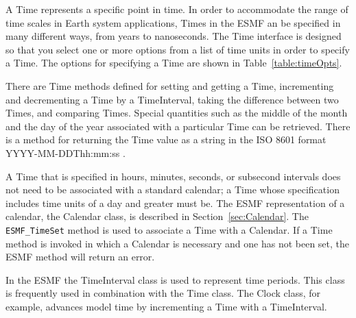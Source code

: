 \label{sec:Time}

A Time represents a specific point in time.  In order to accommodate
the range of time scales in Earth system applications, Times in
the ESMF an be specified in many different ways, from years to 
nanoseconds.  The Time interface is designed so that you select one or 
more options from a list of time units in order to specify a 
Time. The options for specifying a Time are shown in 
Table~\ref{table:timeOpts}.  

There are Time methods defined for setting and getting a
Time, incrementing and decrementing a Time by a TimeInterval,
taking the difference between two Times, and comparing Times.
Special quantities such as the middle of the month and the 
day of the year associated with a particular Time can be retrieved. 
There is a method for returning the Time value as a string in 
the ISO 8601 format YYYY-MM-DDThh:mm:ss \cite{ISO}.

A Time that is specified in hours, minutes, seconds, or subsecond intervals 
does not need to be associated with a standard calendar; a Time whose
specification includes time units of a day and greater must be.  The 
ESMF representation
of a calendar, the Calendar class, is described in Section~\ref{sec:Calendar}.
The {\tt ESMF\_TimeSet} method is used to associate a Time with a 
Calendar.  If a Time method is invoked in which a Calendar is 
necessary and one has not been set, the ESMF method will return an error.

In the ESMF the TimeInterval class is used to represent time periods.
This class is frequently used in combination with the Time class.
The Clock class, for example, advances model time by incrementing a
Time with a TimeInterval. 
 





